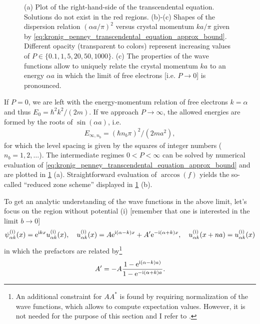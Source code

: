 \begin{figure}
    \caption{
    (a) Plot of the right-hand-side of the transcendental equation. Solutions do not exist in the red regions.
    (b)-(c) Shapes of the dispersion relation $(\alpha a/\pi)^2$ versus crystal momentum $ka/\pi$ given by \cref{eq:kronig_penney_transcendental_equation_approx_bound}.
    Different opacity (transparent to colors) represent increasing values of $P\in\{0.1,1,5,20,50,1000\}$.
    (c) The properties of the wave functions allow to uniquely relate the crystal momentum $ka$ to an energy $\alpha a$ in which the limit of free electrons [i.e. $P\rightarrow0$] is pronounced.}
    \label{fig:kronig_penney_dispersion}
\end{figure}

If $P=0$, we are left with the energy-momentum relation of free electrons $k=\alpha$ and thus $E_0={\hbar^2k^2}/({2m})$.
If we approach $P\rightarrow\infty$, the allowed energies are formed by the roots of $\sin(\alpha a)$, i.e.
\begin{align}
    E_{\infty,n_b}=(\hbar n_b\pi)^2/(2ma^2),
    \label{eq:kronig_penney_energy_tb}
\end{align}
for which the level spacing is given by the squares of integer numbers ($n_b=1,2,\dots$).
The intermediate regimes $0<P<\infty$ can be solved by numerical evaluation of \cref{eq:kronig_penney_transcendental_equation_approx_bound} and are plotted in \cref{fig:kronig_penney_dispersion} (a).
Straightforward evaluation of $\arccos(f)$ yields the so-called ``reduced zone scheme'' displayed in \cref{fig:kronig_penney_dispersion} (b).

To get an analytic understanding of the wave functions in the above limit, let's focus on the region without potential (i) [remember that one is interested in the limit $b\rightarrow0$]
\begin{align}
    \psi_{\alpha k}^{\rm (i)}(x) = \mathrm e^{\mathrm i kx}u_{\alpha k}^{\rm (i)}(x),
    \quad
    u_{\alpha k}^{\rm (i)}(x) = A\mathrm e^{\mathrm i(\alpha-k) x} + A'\mathrm e^{-\mathrm i(\alpha+k) x},
    \quad
    u_{\alpha k}^{\rm (i)}(x+na)=u_{\alpha k}^{\rm (i)}(x)
    \label{eq:kronig_penney_wavefunctions}
\end{align}
in which the prefactors are related by\footnote{An additional constraint for $AA^*$ is found by requiring normalization of the wave functions, which allows to compute expectation values. However, it is not needed for the purpose of this section and I refer to \cite{KronigPenney1931}.}
\begin{align}
    A' = -A\frac{1-\mathrm e^{\mathrm i(\alpha-k)a)}}{1-\mathrm e^{-\mathrm i(\alpha+k)a}}.
    \label{eq:kronig_penney_constants}
\end{align}


